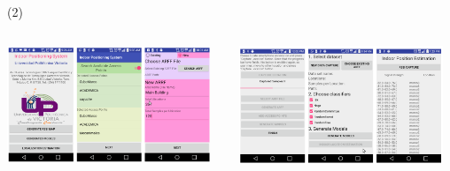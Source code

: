 \begin{frame}{ \footnotemark (2)}
\begin{columns}
\begin{column}{0.5\textwidth}
  \begin{center}
     \includegraphics[width=0.95\textwidth]{Figs/IndoorPositionSystem3}
     \end{center}

\end{column}
\begin{column}{0.5\textwidth}
  \begin{center}
     \includegraphics[width=0.95\textwidth]{Figs/IndoorPositionSystem4}
     \end{center}

\end{column}

\end{columns}



\end{frame}





